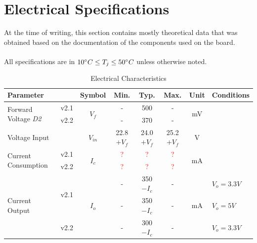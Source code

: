 \documentclass[10pt]{datasheet}
\begin{document}
\section{Electrical Specifications}
\label{sec:elec_spec}
At the time of writing, this section contains mostly theoretical data that was obtained based on the documentation of the components used on the board.
\\\\ All specifications are in $10\degree C \leq T_j \leq 50\degree C$ unless otherwise noted.
\begin{table}[h]
\begin{threeparttable}
\caption{Electrical Characteristics}
\label{table:elec_char}
\begin{tabularx}{\textwidth}{l c | c| c c c | c | X}
    \thickhline
    \textbf{Parameter} & & \textbf{Symbol} & \textbf{Min.} & \textbf{Typ.} & \textbf{Max.} &
    \textbf{Unit} & \textbf{Conditions} \\
    \hline
    \multicolumn{1}{l|}{\multirow{2}{*}{Forward Voltage \textit{D2}\tnote{1}}} & v2.1 &\multirow{2}{*}{$V_{f}$} & - & 500\tnote{\cite{ref2}} & - & \multirow{2}{*}{mV} %
    \\
    \cline{2-2}
    \cline{4-6}
    \multicolumn{1}{l|}{} & v2.2 & & - & 370\tnote{\cite{ref3}} & - & &
    \\
    \hline
    Voltage Input\tnote{2}  & &$V_{in}$ & 22.8$+V_f$ & 24.0$+V_f$ & 25.2$+V_f$ & V %
    \\
    \hline
    \multicolumn{1}{l|}{\multirow{2}{*}{Current Consumption}} & v2.1 &\multirow{2}{*}{$I_c$} & \textcolor{red}? & \textcolor{red}? & \textcolor{red}? & \multirow{2}{*}{mA} & \multirow{2}{*}{}\\
    \cline{2-2}
    \cline{4-6}
    \multicolumn{1}{l|}{} & v2.2 & &\textcolor{red}? & \textcolor{red}? &\textcolor{red}? & &
    \\
    \hline
    \multicolumn{1}{l|}{\multirow{4}{*}{Current Output\tnote{3}}} & \multirow{2}{*}{v2.1} &\multirow{4}{*}{$I_o$\tnote{4}} & - & 350$-I_c$ & - & \multirow{4}{*}{mA} & $V_o=3.3V$\tnote{\cite{ref4}}\\
    \cline{4-6}
    \cline{8-8}
    \multicolumn{1}{l|}{}& & & - & 350$-I_c$ & - & &$V_o=5V$\tnote{\cite{ref4}}
    \\
    \cline{2-2}
    \cline{4-6}
    \cline{8-8}
    \multicolumn{1}{l|}{}& \multirow{2}{*}{v2.2} & & - & 300$-I_c$ & - & & $V_o=3.3V$\tnote{\cite{ref5}}
    \\

\end{tabularx}
\end{threeparttable}
\end{table}
\end{document}

